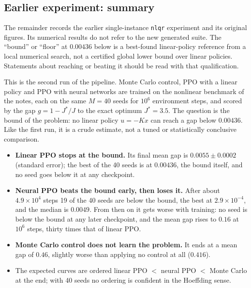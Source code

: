 \documentclass[11pt]{article}
\begin{document}
\subsection*{Earlier experiment: summary}

The remainder records the earlier single-instance \texttt{nlqr} experiment and its
original figures. Its numerical results do not refer to the new generated suite.
The ``bound'' or ``floor'' at $0.00436$ below is a best-found linear-policy reference
from a local numerical search, not a certified global lower bound over linear policies.
Statements about reaching or beating it should be read with that qualification.

This is the second run of the pipeline. Monte Carlo control, PPO with a linear policy and PPO with
neural networks are trained on the nonlinear benchmark of the notes, each on the same $M = 40$
seeds for $10^6$ environment steps, and scored by the gap $g = 1 - J^*/J$ to the exact optimum
$J^* = 3.5$. The question is the bound of the problem: no linear policy $u = -Kx$ can reach a gap
below $0.00436$. Like the first run, it is a crude estimate, not a tuned or statistically conclusive
comparison.

\begin{itemize}[leftmargin=*]
  \item \textbf{Linear PPO stops at the bound.} Its final mean gap is $0.0055 \pm 0.0002$ (standard
    error); the best of the 40 seeds is at $0.00436$, the bound itself, and no seed goes below it at
    any checkpoint.
  \item \textbf{Neural PPO beats the bound early, then loses it.} After about $4.9 \times 10^4$
    steps 19 of the 40 seeds are below the bound, the best at $2.9 \times 10^{-4}$, and the median is
    $0.0049$. From then on it gets worse with training: no seed is below the bound at any later
    checkpoint, and the mean gap rises to $0.16$ at $10^6$ steps, thirty times that of linear PPO.
  \item \textbf{Monte Carlo control does not learn the problem.} It ends at a mean gap of $0.46$,
    slightly worse than applying no control at all ($0.416$).
  \item The expected curves are ordered linear PPO $<$ neural PPO $<$ Monte Carlo at the end; with 40
    seeds no ordering is confident in the Hoeffding sense.
\end{itemize}

\end{document}
